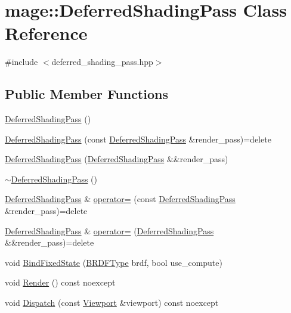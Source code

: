 \hypertarget{classmage_1_1_deferred_shading_pass}{}\section{mage\+:\+:Deferred\+Shading\+Pass Class Reference}
\label{classmage_1_1_deferred_shading_pass}


{\ttfamily \#include $<$deferred\+\_\+shading\+\_\+pass.\+hpp$>$}

\subsection*{Public Member Functions}
\begin{DoxyCompactItemize}
\item 
\hyperlink{classmage_1_1_deferred_shading_pass_a348c86ce12342110299739d8d63c6aaf}{Deferred\+Shading\+Pass} ()
\item 
\hyperlink{classmage_1_1_deferred_shading_pass_a4820a800b8ffc4cf0a7d155b09b71210}{Deferred\+Shading\+Pass} (const \hyperlink{classmage_1_1_deferred_shading_pass}{Deferred\+Shading\+Pass} \&render\+\_\+pass)=delete
\item 
\hyperlink{classmage_1_1_deferred_shading_pass_a1aff32dc53f6e377728898ba362d0116}{Deferred\+Shading\+Pass} (\hyperlink{classmage_1_1_deferred_shading_pass}{Deferred\+Shading\+Pass} \&\&render\+\_\+pass)
\item 
\hyperlink{classmage_1_1_deferred_shading_pass_a0feba3a73c56e1c07abe19fddd890f76}{$\sim$\+Deferred\+Shading\+Pass} ()
\item 
\hyperlink{classmage_1_1_deferred_shading_pass}{Deferred\+Shading\+Pass} \& \hyperlink{classmage_1_1_deferred_shading_pass_afcb5b0299030a2a60dcb3685ca875e3e}{operator=} (const \hyperlink{classmage_1_1_deferred_shading_pass}{Deferred\+Shading\+Pass} \&render\+\_\+pass)=delete
\item 
\hyperlink{classmage_1_1_deferred_shading_pass}{Deferred\+Shading\+Pass} \& \hyperlink{classmage_1_1_deferred_shading_pass_a1a3ee174f93d538bd1c8c6a37f1e94f7}{operator=} (\hyperlink{classmage_1_1_deferred_shading_pass}{Deferred\+Shading\+Pass} \&\&render\+\_\+pass)=delete
\item 
void \hyperlink{classmage_1_1_deferred_shading_pass_a5e8abef0fb3e57f13d51f192dff74770}{Bind\+Fixed\+State} (\hyperlink{namespacemage_ae7a7a03a7b34d7e2689689bb8295cd38}{B\+R\+D\+F\+Type} brdf, bool use\+\_\+compute)
\item 
void \hyperlink{classmage_1_1_deferred_shading_pass_abc1566b2c89f2f043d6ec73f313e388a}{Render} () const noexcept
\item 
void \hyperlink{classmage_1_1_deferred_shading_pass_a37f010236b8c071f67fa33ec0daa75f7}{Dispatch} (const \hyperlink{classmage_1_1_viewport}{Viewport} \&viewport) const noexcept
\end{DoxyCompactItemize}
